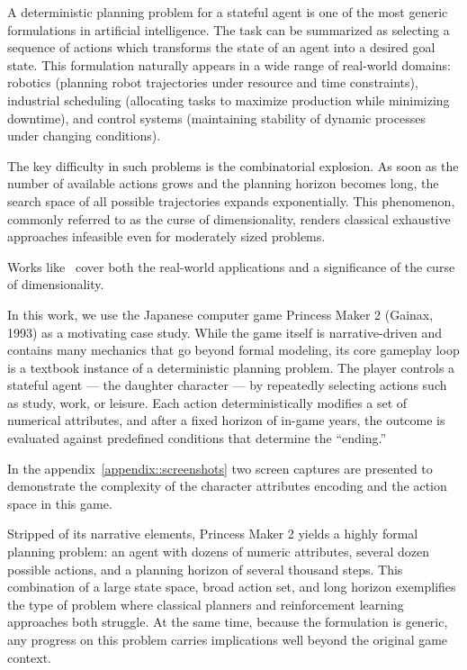 \documentclass[12pt, a4paper]{report}
\begin{document}
	A deterministic planning problem for a stateful agent is one of the most generic formulations in artificial intelligence. 
	The task can be summarized as selecting a sequence of actions which transforms the state of an agent into a desired goal state. 
	This formulation naturally appears in a wide range of real-world domains: robotics (planning robot trajectories under resource and time constraints), industrial scheduling (allocating tasks to maximize production while minimizing downtime), and control systems (maintaining stability of dynamic processes under changing conditions).
	
	The key difficulty in such problems is the combinatorial explosion. 
	As soon as the number of available actions grows and the planning horizon becomes long, the search space of all possible trajectories expands exponentially. 
	This phenomenon, commonly referred to as the curse of dimensionality, renders classical exhaustive approaches infeasible even for moderately sized problems.
	
	Works like~\cite{WOS:001308319900003} cover both the real-world applications and a significance of the curse of dimensionality.
	
	In this work, we use the Japanese computer game Princess Maker 2 (Gainax, 1993) as a motivating case study. 
	While the game itself is narrative-driven and contains many mechanics that go beyond formal modeling, its core gameplay loop is a textbook instance of a deterministic planning problem. 
	The player controls a stateful agent — the daughter character — by repeatedly selecting actions such as study, work, or leisure. 
	Each action deterministically modifies a set of numerical attributes, and after a fixed horizon of in-game years, the outcome is evaluated against predefined conditions that determine the “ending.”
	
	In the appendix~\ref{appendix::screenshots} two screen captures are presented to demonstrate the complexity of the character attributes encoding and the action space in this game.
	
	Stripped of its narrative elements, Princess Maker 2 yields a highly formal planning problem: an agent with dozens of numeric attributes, several dozen possible actions, and a planning horizon of several thousand steps. 
	This combination of a large state space, broad action set, and long horizon exemplifies the type of problem where classical planners and reinforcement learning approaches both struggle. 
	At the same time, because the formulation is generic, any progress on this problem carries implications well beyond the original game context.
	
\end{document}
